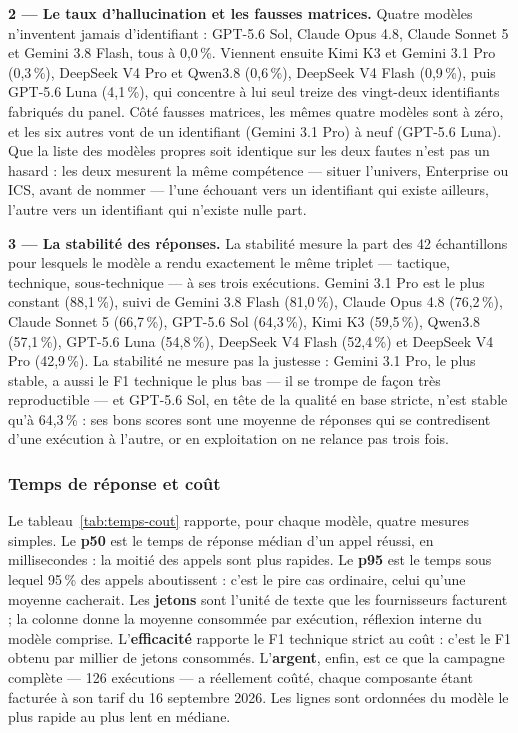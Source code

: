 \textbf{2 --- Le taux d'hallucination et les fausses matrices.} Quatre modèles n'inventent jamais d'identifiant : GPT-5.6 Sol, Claude Opus 4.8, Claude Sonnet 5 et Gemini 3.8 Flash, tous à 0,0\,\%. Viennent ensuite Kimi K3 et Gemini 3.1 Pro (0,3\,\%), DeepSeek V4 Pro et Qwen3.8 (0,6\,\%), DeepSeek V4 Flash (0,9\,\%), puis GPT-5.6 Luna (4,1\,\%), qui concentre à lui seul treize des vingt-deux identifiants fabriqués du panel. Côté fausses matrices, les mêmes quatre modèles sont à zéro, et les six autres vont de un identifiant (Gemini 3.1 Pro) à neuf (GPT-5.6 Luna). Que la liste des modèles propres soit identique sur les deux fautes n'est pas un hasard : les deux mesurent la même compétence --- situer l'univers, Enterprise ou ICS, avant de nommer --- l'une échouant vers un identifiant qui existe ailleurs, l'autre vers un identifiant qui n'existe nulle part.

\textbf{3 --- La stabilité des réponses.} La stabilité mesure la part des 42 échantillons pour lesquels le modèle a rendu exactement le même triplet --- tactique, technique, sous-technique --- à ses trois exécutions. Gemini 3.1 Pro est le plus constant (88,1\,\%), suivi de Gemini 3.8 Flash (81,0\,\%), Claude Opus 4.8 (76,2\,\%), Claude Sonnet 5 (66,7\,\%), GPT-5.6 Sol (64,3\,\%), Kimi K3 (59,5\,\%), Qwen3.8 (57,1\,\%), GPT-5.6 Luna (54,8\,\%), DeepSeek V4 Flash (52,4\,\%) et DeepSeek V4 Pro (42,9\,\%). La stabilité ne mesure pas la justesse : Gemini 3.1 Pro, le plus stable, a aussi le F1 technique le plus bas --- il se trompe de façon très reproductible --- et GPT-5.6 Sol, en tête de la qualité en base stricte, n'est stable qu'à 64,3\,\% : ses bons scores sont une moyenne de réponses qui se contredisent d'une exécution à l'autre, or en exploitation on ne relance pas trois fois.

\subsubsection{Temps de réponse et coût}\label{sec:5-3}

Le tableau~\ref{tab:temps-cout} rapporte, pour chaque modèle, quatre mesures simples. Le \textbf{p50} est le temps de réponse médian d'un appel réussi, en millisecondes : la moitié des appels sont plus rapides. Le \textbf{p95} est le temps sous lequel 95\,\% des appels aboutissent : c'est le pire cas ordinaire, celui qu'une moyenne cacherait. Les \textbf{jetons} sont l'unité de texte que les fournisseurs facturent ; la colonne donne la moyenne consommée par exécution, réflexion interne du modèle comprise. L'\textbf{efficacité} rapporte le F1 technique strict au coût : c'est le F1 obtenu par millier de jetons consommés. L'\textbf{argent}, enfin, est ce que la campagne complète --- 126 exécutions --- a réellement coûté, chaque composante étant facturée à son tarif du 16 septembre 2026. Les lignes sont ordonnées du modèle le plus rapide au plus lent en médiane.

